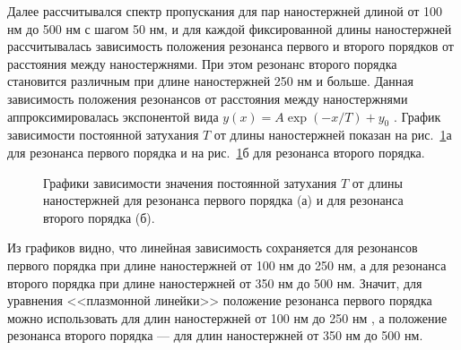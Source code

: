 Далее рассчитывался спектр пропускания для пар наностержней длиной от 100 нм до 500 нм с шагом 50 нм, и для каждой фиксированной длины наностержней рассчитывалась зависимость положения резонанса первого и второго порядков от расстояния между наностержнями. При этом резонанс второго порядка становится различным при длине наностержней 250 нм и больше. Данная зависимость положения резонансов от расстояния между наностержнями аппроксимировалась экспонентой вида $ y(x) = A \exp (-x/ T ) + y_0 $ . График зависимости постоянной затухания $ T $ от длины наностержней показан на рис.~\ref{img:expdecay}а для резонанса первого порядка и на рис.~\ref{img:expdecay}б для резонанса второго порядка.

\begin{figure}
\caption{Графики зависимости значения постоянной затухания $ T $ от длины наностержней для резонанса первого порядка (а) и для резонанса второго порядка (б).}
\label{img:expdecay}
\end{figure}

Из графиков видно, что линейная зависимость сохраняется для резонансов первого порядка при длине наностержней от 100 нм до 250 нм, а для резонанса второго порядка при длине наностержней от 350 нм до 500 нм. Значит, для уравнения <<плазмонной линейки>> положение резонанса первого порядка можно использовать для длин наностержней от 100 нм до 250 нм  , а положение резонанса второго порядка --- для длин наностержней от 350 нм до 500 нм.

